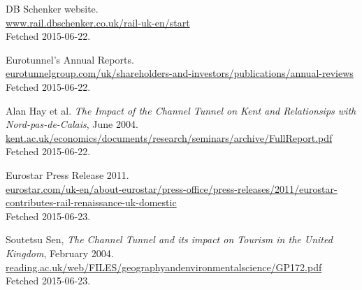 \documentclass[12pt]{article} %
\begin{document}
\begin{thebibliography}{99}
	DB Schenker website.\\
	\url{www.rail.dbschenker.co.uk/rail-uk-en/start}\\
	Fetched 2015-06-22.

	Eurotunnel's Annual Reports.\\
	\url{eurotunnelgroup.com/uk/shareholders-and-investors/publications/annual-reviews}\\
	Fetched 2015-06-22.

	Alan Hay et al. \textit{The Impact of the Channel Tunnel on Kent and Relationsips with Nord-pas-de-Calais}, June 2004.\\
	\url{kent.ac.uk/economics/documents/research/seminars/archive/FullReport.pdf}\\
	Fetched 2015-06-22.

	Eurostar Press Release 2011.\\
	\url{eurostar.com/uk-en/about-eurostar/press-office/press-releases/2011/eurostar-contributes-rail-renaissance-uk-domestic}\\
	Fetched 2015-06-23.

	Soutetsu Sen, \emph{The Channel Tunnel and its impact on
Tourism in the United Kingdom}, February 2004.\\
	\url{reading.ac.uk/web/FILES/geographyandenvironmentalscience/GP172.pdf}\\
	Fetched 2015-06-23.

\end{thebibliography}
\end{document}
